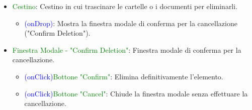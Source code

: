\documentclass[aspectratio=169, dvipsnames]{beamer}
\begin{document}
\begin{frame}
\begin{itemize}
        \item \textcolor{Green}{Cestino}: Cestino in cui trascinare le cartelle o i documenti per eliminarli.
              \begin{itemize}
                  \item \textcolor{Blue}{(onDrop)}: Mostra la finestra modale di conferma per la cancellazione
                        ("Confirm Deletion").
              \end{itemize}

        \item \textcolor{Green}{Finestra Modale - "Confirm Deletion"}: Finestra modale di conferma per
              la cancellazione.
              \begin{itemize}
                  \item \textcolor{Blue}{(onClick)}\textrightarrow \textcolor{Green}{Bottone "Confirm"}:
                        Elimina definitivamente l'elemento.
                  \item \textcolor{Blue}{(onClick)}\textrightarrow \textcolor{Green}{Bottone "Cancel"}:
                        Chiude la finestra modale senza effettuare la cancellazione.
              \end{itemize}
    \end{itemize}
\end{frame}
\end{document}
